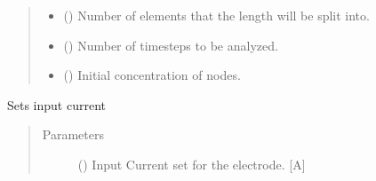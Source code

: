 \documentclass[letterpaper,10pt,english]{sphinxmanual}
\begin{document}
\begin{fulllineitems}
\begin{fulllineitems}
\begin{quote}
\begin{description}
\begin{itemize}
\item {} 
\sphinxAtStartPar
{} (\sphinxstyleliteralemphasis{\sphinxupquote{{[}}}\sphinxstyleliteralemphasis{\sphinxupquote{{]}}}) \textendash{} Number of elements that the length will be split into.

\item {} 
\sphinxAtStartPar
{} (\sphinxstyleliteralemphasis{\sphinxupquote{{[}}}\sphinxstyleliteralemphasis{\sphinxupquote{{]}}}) \textendash{} Number of timesteps to be analyzed.

\item {} 
\sphinxAtStartPar
{} (\sphinxstyleliteralemphasis{\sphinxupquote{{[}}}\sphinxstyleliteralemphasis{\sphinxupquote{{]}}}) \textendash{} Initial concentration of nodes.

\end{itemize}

\end{description}\end{quote}

\end{fulllineitems}


\begin{fulllineitems}
\label{\detokenize{electrode:electrode.Electrode.set_input_current}}
\sphinxAtStartPar
Sets input current
\begin{quote}\begin{description}
\item[{Parameters}] \leavevmode
\sphinxAtStartPar
{} (\sphinxstyleliteralemphasis{\sphinxupquote{{[}}}\sphinxstyleliteralemphasis{\sphinxupquote{{]}}}) \textendash{} Input Current set for the electrode. {[}A{]}

\end{description}\end{quote}

\end{fulllineitems}


\end{fulllineitems}
\end{document}

